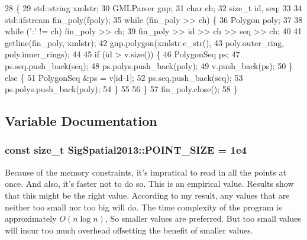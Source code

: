 \begin{DoxyCode}
28     \{
29         std::string xmlstr;
30         GMLParser gnp;
31         \textcolor{keywordtype}{char} ch;
32         \textcolor{keywordtype}{size\_t} id, seq;
33 
34         std::ifstream fin\_poly(fpoly);
35         \textcolor{keywordflow}{while} (fin\_poly >> ch) \{
36             Polygon poly;
37 
38             \textcolor{keywordflow}{while} (\textcolor{charliteral}{':'} != ch) fin\_poly >> ch;
39             fin\_poly >> \textcolor{keywordtype}{id} >> ch >> seq >> ch;
40 
41             getline(fin\_poly, xmlstr);
42             gnp.polygon(xmlstr.c\_str(),
43                         poly.outer\_ring, poly.inner\_rings);
44 
45             \textcolor{keywordflow}{if} (\textcolor{keywordtype}{id} > v.size()) \{
46                 PolygonSeq ps;
47                 ps.seq.push\_back(seq);
48                 ps.polys.push\_back(poly);
49                 v.push\_back(ps);
50             \} \textcolor{keywordflow}{else} \{
51                 PolygonSeq &ps = v[\textcolor{keywordtype}{id}-1];
52                 ps.seq.push\_back(seq);
53                 ps.polys.push\_back(poly);
54             \}
55 
56         \}
57         fin\_poly.close();
58     \}
\end{DoxyCode}


\subsection{Variable Documentation}
\hypertarget{namespaceSigSpatial2013_a1d63766b99e35a7acbb9e1bffbcc9057}{
\subsubsection[{P\-O\-I\-N\-T\-\_\-\-S\-I\-Z\-E}]{\setlength{\rightskip}{0pt plus 5cm}const size\-\_\-t Sig\-Spatial2013\-::\-P\-O\-I\-N\-T\-\_\-\-S\-I\-Z\-E = 1e4}}\label{namespaceSigSpatial2013_a1d63766b99e35a7acbb9e1bffbcc9057}
Because of the memory constraints, it's impratical to read in all the points at once. And also, it's faster not to do so. This is an empirical value. Results show that this might be the right value. According to my result, any values that are neither too small nor too big will do. The time complexity of the program is approximately $ O(n\log n)$, So smaller values are preferred. But too small values will incur too much overhead offsetting the benefit of smaller values. 

